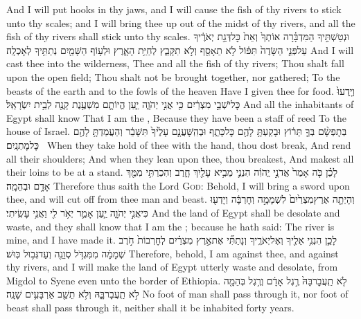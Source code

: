 {And I will put hooks in thy jaws, and I will cause the fish of thy rivers to stick unto thy scales; and I will bring thee up out of the midst of thy rivers, and all the fish of thy rivers shall stick unto thy scales.}
{וּנְטַשְׁתִּ֣יךָ הַמִּדְבָּ֗רָה אוֹתְךָ֙ וְאֵת֙ כׇּל\maqqaf דְּגַ֣ת יְאֹרֶ֔יךָ עַל\maqqaf פְּנֵ֤י הַשָּׂדֶה֙ תִּפּ֔וֹל לֹ֥א תֵאָסֵ֖ף וְלֹ֣א תִקָּבֵ֑ץ לְחַיַּ֥ת הָאָ֛רֶץ וּלְע֥וֹף הַשָּׁמַ֖יִם נְתַתִּ֥יךָ לְאׇכְלָֽה׃}
{And I will cast thee into the wilderness, Thee and all the fish of thy rivers; Thou shalt fall upon the open field; Thou shalt not be brought together, nor gathered; To the beasts of the earth and to the fowls of the heaven Have I given thee for food.}
{וְיָֽדְעוּ֙ כׇּל\maqqaf יֹשְׁבֵ֣י מִצְרַ֔יִם כִּ֖י אֲנִ֣י יְהֹוָ֑ה יַ֧עַן הֱיוֹתָ֛ם מִשְׁעֶ֥נֶת קָנֶ֖ה לְבֵ֥ית יִשְׂרָאֵֽל׃}
{And all the inhabitants of Egypt shall know That I am the \lord, Because they have been a staff of reed To the house of Israel.}
{בְּתׇפְשָׂ֨ם בְּךָ֤  תֵּר֔וֹץ וּבָקַעְתָּ֥ לָהֶ֖ם כׇּל\maqqaf כָּתֵ֑ף וּבְהִֽשָּׁעֲנָ֤ם עָלֶ֙יךָ֙ תִּשָּׁבֵ֔ר וְהַעֲמַדְתָּ֥ לָהֶ֖ם כׇּל\maqqaf מׇתְנָֽיִם׃ \setuma }
{When they take hold of thee with the hand, thou dost break, And rend all their shoulders; And when they lean upon thee, thou breakest, And makest all their loins to be at a stand.}
{לָכֵ֗ן כֹּ֤ה אָמַר֙ אֲדֹנָ֣י יֱהֹוִ֔ה הִנְנִ֛י מֵבִ֥יא עָלַ֖יִךְ חָ֑רֶב וְהִכְרַתִּ֥י מִמֵּ֖ךְ אָדָ֥ם וּבְהֵמָֽה׃}
{Therefore thus saith the Lord \textsc{God}: Behold, I will bring a sword upon thee, and will cut off from thee man and beast.}
{וְהָיְתָ֤ה אֶרֶץ\maqqaf מִצְרַ֙יִם֙ לִשְׁמָמָ֣ה וְחׇרְבָּ֔ה וְיָדְע֖וּ כִּי\maqqaf אֲנִ֣י יְהֹוָ֑ה יַ֧עַן אָמַ֛ר יְאֹ֥ר לִ֖י וַאֲנִ֥י עָשִֽׂיתִי׃}
{And the land of Egypt shall be desolate and waste, and they shall know that I am the \lord; because he hath said: The river is mine, and I have made it.}
{לָכֵ֛ן הִנְנִ֥י אֵלֶ֖יךָ וְאֶל\maqqaf יְאֹרֶ֑יךָ וְנָתַתִּ֞י אֶת\maqqaf אֶ֣רֶץ מִצְרַ֗יִם לְחׇרְבוֹת֙ חֹ֣רֶב שְׁמָמָ֔ה מִמִּגְדֹּ֥ל סְוֵנֵ֖ה וְעַד\maqqaf גְּב֥וּל כּֽוּשׁ׃}
{Therefore, behold, I am against thee, and against thy rivers, and I will make the land of Egypt utterly waste and desolate, from Migdol to Syene even unto the border of Ethiopia.}
{לֹ֤א תַֽעֲבׇר\maqqaf בָּהּ֙ רֶ֣גֶל אָדָ֔ם וְרֶ֥גֶל בְּהֵמָ֖ה לֹ֣א תַֽעֲבָר\maqqaf בָּ֑הּ וְלֹ֥א תֵשֵׁ֖ב אַרְבָּעִ֥ים שָׁנָֽה׃}
{No foot of man shall pass through it, nor foot of beast shall pass through it, neither shall it be inhabited forty years.}
